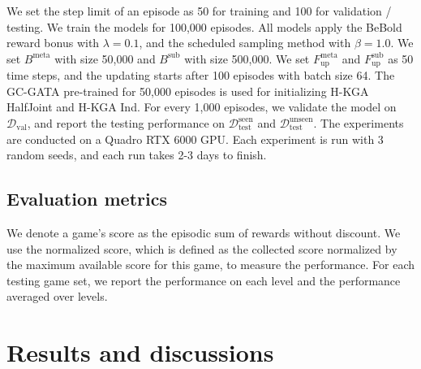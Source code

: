 \documentclass[11pt]{article}
\begin{document}
We set the step limit of an episode as 50 for training and 100 for validation / testing. We train the models for 100,000 episodes. All models apply the BeBold reward bonus with $\lambda = 0.1$, and the scheduled sampling method with $\beta = 1.0$. 
We set $B^{\text{meta}}$ with size 50,000 and $B^{\text{sub}}$ with size 500,000.
We set $F_{\text{up}}^{\text{meta}}$ and $F_{\text{up}}^{\text{sub}}$ as 50 time steps, and the updating starts after 100 episodes with batch size 64.
The GC-GATA pre-trained for 50,000 episodes is used for initializing 
H-KGA HalfJoint and H-KGA Ind. 
For every 1,000 episodes, we validate the model on $\mathcal{D}_{\text{val}}$, and report the testing performance on $\mathcal{D}_{\text{test}}^{\text{seen}}$ and $\mathcal{D}_{\text{test}}^{\text{unseen}}$. 
The experiments are conducted on a Quadro RTX 6000 GPU. Each experiment is run with 3 random seeds, and each run takes 2-3 days to finish.


\subsection{Evaluation metrics}
We denote a game's score as the episodic sum of rewards without discount. 
We use the normalized score, which is defined as the collected score normalized by the maximum available score for this game, to measure the performance.
For each testing game set, we report the performance on each level and the performance averaged over levels. 

\section{Results and discussions \label{section_results_and_discussions}}
\end{document}
